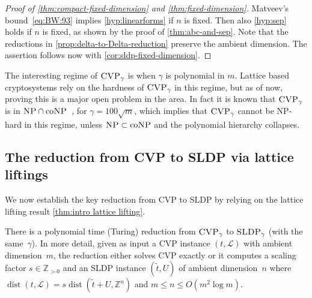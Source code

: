 \documentclass[a4paper,USenglish,cleveref,numberwithinsect]{lipics-v2021}
\DeclareMathOperator{\dist}{dist}
\newcommand{\ZZ}{\mathbb{Z}}
\numberwithin{equation}{section}
\begin{document}
\begin{proof}[Proof of \cref{thm:compact-fixed-dimension} and \cref{thm:fixed-dimension}]
Matveev's bound~\eqref{eq:BW:93} implies \cref{hyp:linearforms} if $n$ is fixed.
Then also \cref{hyp:sep} holds if $n$ is fixed, as shown by the proof of \cref{thm:abc-and-sep}.
Note that the reductions in \cref{prop:delta-to-Delta-reduction} preserve the ambient dimension.
The assertion follows now with \cref{cor:sldp-fixed-dimension}.
\end{proof}

\begin{remark}
The interesting regime of $\textsc{CVP}_\gamma$ is when $\gamma$ is polynomial in $m$.
Lattice based cryptosystems rely on the hardness of
$\textsc{CVP}_\gamma$ in this regime, but as of now,
proving this is a major open problem in the area.
In fact it is known that  $\textsc{CVP}_\gamma$
is in $\textsc{NP}\cap\text{co}\textsc{NP}$~\cite{aharonov-regev},
for $\gamma=100\sqrt{m}$,
which implies that $\textsc{CVP}_\gamma$
cannot be \textsc{NP}-hard in this regime,
unless $\textsc{NP}\subset\text{co}\textsc{NP}$ and the polynomial hierarchy collapses.
\end{remark}


\subsection{The reduction from \textsc{CVP} to \textsc{SLDP} via lattice liftings}\label{sec:liftings}
We now establish the key reduction from
\textsc{CVP} to \textsc{SLDP}
by relying on the lattice lifting result \cref{thm:intro lattice lifting}.

\begin{theorem}\label{thm:red-cvp-2-sldp}
There is a polynomial time (Turing) reduction from
$\textsc{CVP}_{\gamma}$ to $\textsc{SLDP}_{\gamma}$
(with the same~$\gamma$).
In more detail, given as input a \textsc{CVP} instance $(t,\mathcal{L})$ with ambient dimension~$m$, the reduction either solves \textsc{CVP} exactly or it computes a scaling factor $s\in\ZZ_{>0}$ and an \textsc{SLDP} instance $(\tilde{t},U)$ of ambient dimension~$n$ where $\dist(t,\mathcal{L})=s\dist(\tilde{t}+U,\ZZ^n)$ and $m\le n\le O(m^2\log m)$.
\end{theorem}
\end{document}
